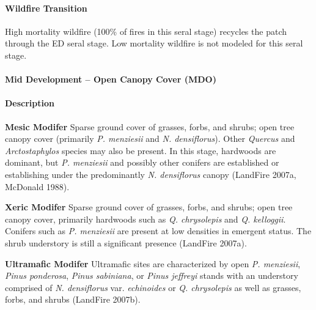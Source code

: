 \paragraph{Wildfire Transition} High mortality wildfire (100\% of fires in this seral stage) recycles the patch through the ED seral stage. Low mortality wildfire is not modeled for this seral stage.

\noindent\hrulefill


\paragraph{Mid Development – Open Canopy Cover (MDO)}

\paragraph{Description}
\begin{adjustwidth}{2cm}{}
\textbf{Mesic Modifer } Sparse ground cover of grasses, forbs, and shrubs; open tree canopy cover (primarily \emph{P. menziesii} and \emph{N. densiflorus}). Other \emph{Quercus} and \emph{Arctostaphylos} species may also be present. In this stage, hardwoods are dominant, but \emph{P. menziesii} and possibly other conifers are established or establishing under the predominantly \emph{N. densiflorus} canopy (LandFire 2007a, McDonald 1988). 


\medskip
\noindent \textbf{Xeric Modifer}  Sparse ground cover of grasses, forbs, and shrubs; open tree canopy cover, primarily hardwoods such as \emph{Q. chrysolepis} and \emph{Q. kelloggii}. Conifers such as \emph{P. menziesii} are present at low densities in emergent status. The shrub understory is still a significant presence (LandFire 2007a). 


\medskip
\noindent \textbf{Ultramafic Modifer}  Ultramafic sites are characterized by open \emph{P. menziesii}, \emph{Pinus ponderosa}, \emph{Pinus sabiniana}, or \emph{Pinus jeffreyi} stands with an understory comprised of \emph{N. densiflorus} var. \emph{echinoides} or \emph{Q. chrysolepis} as well as grasses, forbs, and shrubs (LandFire 2007b).

\end{adjustwidth}
